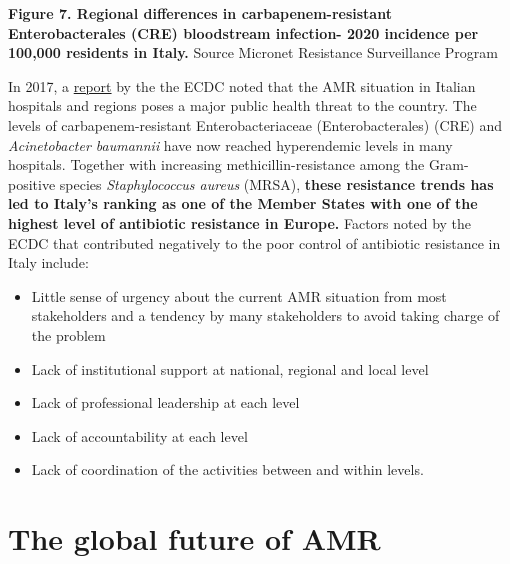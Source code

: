 \documentclass[
]{book}
\providecommand{\tightlist}{%
  \setlength{\itemsep}{0pt}\setlength{\parskip}{0pt}}
\begin{document}
\textbf{Figure 7. Regional differences in carbapenem-resistant Enterobacterales (CRE) bloodstream infection- 2020 incidence per 100,000 residents in Italy.} Source Micronet Resistance Surveillance Program

In 2017, a \href{https://www.ecdc.europa.eu/en/publications-data/ecdc-country-visit-italy-discuss-antimicrobial-resistance-issues}{report} by the the ECDC noted that the AMR situation in Italian hospitals and regions poses a major public health threat to the country. The levels of carbapenem-resistant Enterobacteriaceae (Enterobacterales) (CRE) and \emph{Acinetobacter baumannii} have now reached hyperendemic levels in many hospitals. Together with increasing methicillin-resistance among the Gram-positive species \emph{Staphylococcus aureus} (MRSA), \textbf{these resistance trends has led to Italy's ranking as one of the Member States with one of the highest level of antibiotic resistance in Europe.} Factors noted by the ECDC that contributed negatively to the poor control of antibiotic resistance in Italy include:

\begin{itemize}
\tightlist
\item
  Little sense of urgency about the current AMR situation from most stakeholders and a tendency by many stakeholders to avoid taking charge of the problem
\item
  Lack of institutional support at national, regional and local level
\item
  Lack of professional leadership at each level
\item
  Lack of accountability at each level
\item
  Lack of coordination of the activities between and within levels.
\end{itemize}

\hypertarget{the-global-future-of-amr}{%
\section*{The global future of AMR}\label{the-global-future-of-amr}}
\end{document}
